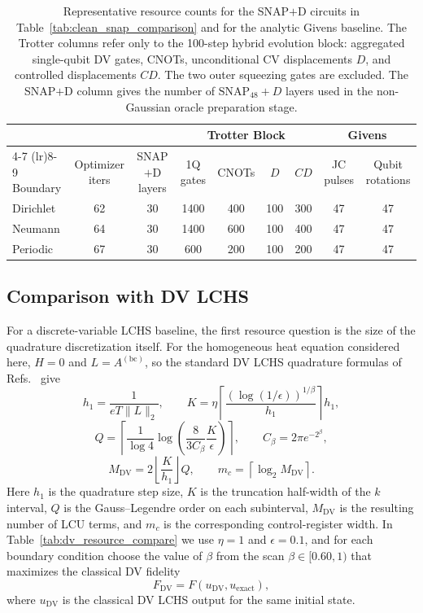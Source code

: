 \begin{table}[h]
\centering
{\small
\caption{Representative resource counts for the SNAP$+$D circuits in Table~\ref{tab:clean_snap_comparison} and for the analytic Givens baseline. The Trotter columns refer only to the 100-step hybrid evolution block: aggregated single-qubit DV gates, CNOTs, unconditional CV displacements $D$, and controlled displacements $CD$. The two outer squeezing gates are excluded. The SNAP$+$D column gives the number of $\mathrm{SNAP}_{48}+D$ layers used in the non-Gaussian oracle preparation stage.}
\label{tab:clean_resource_counts}
\begin{tabular}{lcccccccc}
\toprule
& & & \multicolumn{4}{c}{Trotter Block} & \multicolumn{2}{c}{Givens} \\
\cmidrule(lr){4-7} \cmidrule(lr){8-9}
Boundary & Optimizer iters & SNAP$+$D layers & 1Q gates & CNOTs & $D$ & $CD$ & JC pulses & Qubit rotations \\
\midrule
Dirichlet & 62 & 30 & 1400 & 400 & 100 & 300 & 47 & 47 \\
Neumann & 64 & 30 & 1400 & 600 & 100 & 400 & 47 & 47 \\
Periodic & 67 & 30 & 600 & 200 & 100 & 200 & 47 & 47 \\
\bottomrule
\end{tabular}}
\end{table}

\subsection{Comparison with DV LCHS}

For a discrete-variable LCHS baseline, the first resource question is the size of the quadrature discretization itself. For the homogeneous heat equation considered here, $H=0$ and $L=A^{(\mathrm{bc})}$, so the standard DV LCHS quadrature formulas of Refs.~\cite{LCHS1,LCHS2} give
\[
h_1=\frac{1}{eT\|L\|_2},\qquad
K=\eta\left\lceil \frac{(\log(1/\epsilon))^{1/\beta}}{h_1}\right\rceil h_1,
\]
\[
Q=
\left\lceil
\frac{1}{\log 4}
\log\!\left(
\frac{8}{3C_\beta}\frac{K}{\epsilon}
\right)
\right\rceil,
\qquad
C_\beta = 2\pi e^{-2^\beta},
\]
\[
M_{\mathrm{DV}} = 2\left\lfloor \frac{K}{h_1}\right\rfloor Q,
\qquad
m_c = \left\lceil \log_2 M_{\mathrm{DV}}\right\rceil .
\]
Here $h_1$ is the quadrature step size, $K$ is the truncation half-width of the $k$ interval, $Q$ is the Gauss--Legendre order on each subinterval, $M_{\mathrm{DV}}$ is the resulting number of LCU terms, and $m_c$ is the corresponding control-register width. In Table~\ref{tab:dv_resource_compare} we use $\eta=1$ and $\epsilon=0.1$, and for each boundary condition choose the value of $\beta$ from the scan $\beta\in[0.60,1)$ that maximizes the classical DV fidelity
\[
F_{\mathrm{DV}} = F(u_{\mathrm{DV}},u_{\mathrm{exact}}),
\]
where $u_{\mathrm{DV}}$ is the classical DV LCHS output for the same initial state.

